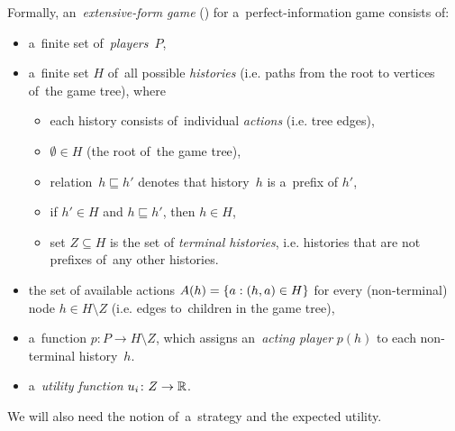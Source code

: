 Formally, an~\emph{extensive-form game} (\cite[p.~200]{Osborne1994course}) for a~perfect-information game consists of:
\begin{itemize}
  \item a~finite set of~\emph{players}~$P$,

  \item a~finite set $H$ of~all possible \emph{histories} (i.e. paths from the root to vertices of~the game tree), where
    \begin{itemize}
      \item each history consists of~individual \emph{actions} (i.e. tree edges),
      \item $\emptyset \in H$ (the root of~the game tree),
      \item relation~$h \sqsubseteq h'$ denotes that history~$h$ is a~prefix of $h'$,
      \item if $h' \in H$ and $h \sqsubseteq h'$, then $h \in H$,
      \item set $Z \subseteq H$ is the set of \emph{terminal histories}, i.e. histories that are not prefixes of~any other histories.
    \end{itemize}

  \item the set of available actions $A(h) = \left\{ a: (h, a) \in H \right\}$ for every (non-terminal) node $h \in H \setminus Z$ (i.e. edges to~children in the game tree),

  \item a~function $p\colon P \to H \setminus Z$, which assigns an~\emph{acting player} $p(h)$ to each non-terminal history~$h$.

  \item a~\emph{utility function} $u_i\colon Z \rightarrow \mathbb{R}$.
\end{itemize}
We will also need the notion of~a~strategy and the expected utility.
